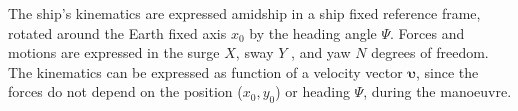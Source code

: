 The ship’s kinematics are expressed amidship in a ship fixed reference frame, rotated around the Earth fixed axis $x_0$ by the heading angle $\Psi$. Forces and motions are expressed in the surge $X$, sway $Y$ , and yaw $N$ degrees of freedom. The kinematics can be expressed as function of a velocity vector $\mathbf{\upsilon}$, since the forces do not depend on the position ($x_0,y_0$) or heading $\Psi$, during the manoeuvre.
\begin{equation}
    \label{eq:lambda__semiempirical}
    
\end{equation}